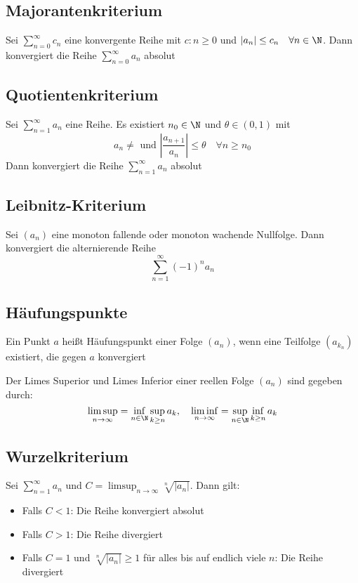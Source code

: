 	\subsection{Majorantenkriterium}
		\begin{Satz} [ ]
			Sei $\displaystyle\sum_{n=0}^\infty c_n$ eine konvergente Reihe mit $c:n \geq 0$ und $|a_n|\leq c_n \quad\forall n\in\N$. Dann konvergiert die Reihe $\displaystyle\sum_{n=0}^\infty a_n$ absolut
		\end{Satz}
	\subsection{Quotientenkriterium}
		\begin{Satz} [ ]
			Sei $\displaystyle\sum_{n=1}^\infty a_n$ eine Reihe. Es existiert $n_0\in\N$ und  $\theta\in(0, 1)$ mit
			$$
				a_n\not = \text{ und } |\frac{a_{n+1}}{a_n}|\leq \theta \quad \forall n\geq n_0
			$$
			Dann konvergiert die Reihe $\displaystyle\sum_{n=1}^\infty a_n$ absolut
		\end{Satz}
	\subsection{Leibnitz-Kriterium}
		\begin{Satz} [ ]
			Sei $(a_n)$ eine monoton fallende oder monoton wachende Nullfolge. Dann konvergiert die alternierende Reihe
			$$
				\displaystyle\sum_{n=1}^\infty(-1)^na_n
			$$
		\end{Satz}
	\subsection{Häufungspunkte}
		\begin{Definition} [ Häufungspunkt]
			Ein Punkt $a$ heißt Häufungspunkt einer Folge $(a_n)$, wenn eine Teilfolge $(a_{k_n})$ existiert, die gegen $a$ konvergiert 
		\end{Definition}
		\begin{Definition} 
			Der Limes Superior und Limes Inferior einer reellen Folge $(a_n)$ sind gegeben durch:
			$$
				\limsup_{n\to \infty} = \inf_{n\in\N}\sup_{k\geq
				 n}a_k, \quad \liminf_{n\to\infty}=\sup_{n\in\N}\inf_{k\geq n}a_k 
			$$
		\end{Definition}
	\subsection{Wurzelkriterium}
		\begin{Satz}
			Sei $\displaystyle\sum_{n=1}^\infty a_n$ und $C=\displaystyle\limsup_{n\to\infty}\sqrt[n]{|a_n|}$. Dann gilt:
			\begin{itemize}
				\item Falls $C<1$: Die Reihe konvergiert absolut
				\item Falls $C>1$: Die Reihe divergiert
				\item Falls $C=1$ und $\sqrt[n]{|a_n|}\geq1$ für alles bis auf endlich viele $n$: Die Reihe divergiert
			\end{itemize}
		\end{Satz}
